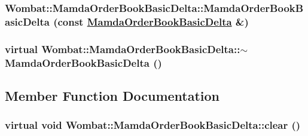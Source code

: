 \hypertarget{classWombat_1_1MamdaOrderBookBasicDelta_fc3c3d8060a8423abce7c3dbb104057f}{
\subsubsection[MamdaOrderBookBasicDelta]{\setlength{\rightskip}{0pt plus 5cm}Wombat::Mamda\-Order\-Book\-Basic\-Delta::Mamda\-Order\-Book\-Basic\-Delta (const \hyperlink{classWombat_1_1MamdaOrderBookBasicDelta}{Mamda\-Order\-Book\-Basic\-Delta} \&)}}
\label{classWombat_1_1MamdaOrderBookBasicDelta_fc3c3d8060a8423abce7c3dbb104057f}


\hypertarget{classWombat_1_1MamdaOrderBookBasicDelta_a286af598256857e898fd6ce033fbd18}{
\subsubsection[$\sim$MamdaOrderBookBasicDelta]{\setlength{\rightskip}{0pt plus 5cm}virtual Wombat::Mamda\-Order\-Book\-Basic\-Delta::$\sim$Mamda\-Order\-Book\-Basic\-Delta ()}}
\label{classWombat_1_1MamdaOrderBookBasicDelta_a286af598256857e898fd6ce033fbd18}




\subsection{Member Function Documentation}
\hypertarget{classWombat_1_1MamdaOrderBookBasicDelta_9cc22c9747cad413d8f6428231f6740c}{
\subsubsection[clear]{\setlength{\rightskip}{0pt plus 5cm}virtual void Wombat::Mamda\-Order\-Book\-Basic\-Delta::clear ()}}
\label{classWombat_1_1MamdaOrderBookBasicDelta_9cc22c9747cad413d8f6428231f6740c}


